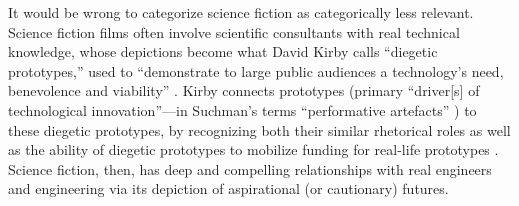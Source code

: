 
It would be wrong to categorize science
fiction as categorically less relevant. Science fiction films
often involve scientific consultants with real
technical knowledge, whose depictions become what David
Kirby calls ``diegetic prototypes,'' used to ``demonstrate to
large public audiences a technology's need, benevolence and
viability'' \cite[p. 43]{kirbyFuture}. Kirby connects prototypes (primary
``driver[s] of technological innovation''---in
Suchman's terms ``performative artefacts'' \cite[p. 45]{kirbyFuture})
to these diegetic prototypes, 
by recognizing both their similar rhetorical roles as well as the
ability of diegetic prototypes to mobilize funding for real-life
prototypes \cite[p. 44-47]{kirbyFuture}. Science fiction, then, has deep
and compelling relationships with real engineers and engineering via
its depiction of aspirational (or cautionary) futures.





